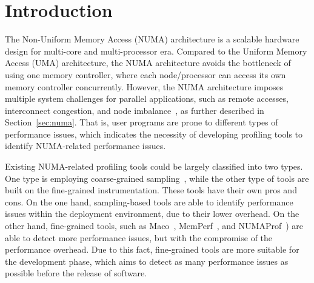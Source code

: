 \section{Introduction}
\label{sec:intro}

The Non-Uniform Memory Access (NUMA) architecture is a scalable hardware design for multi-core and multi-processor era. Compared to the Uniform Memory Access (UMA) architecture, the NUMA architecture avoids the bottleneck of using one memory controller, where each node/processor can access its own memory controller concurrently. However, the NUMA architecture imposes multiple system challenges for parallel applications, such as remote accesses, interconnect congestion, and node imbalance~\cite{Blagodurov:2011:CNC:2002181.2002182}, as further described in Section~\ref{sec:numa}. That is, user programs are prone to different types of performance issues, which indicates the necessity of developing profiling tools to identify NUMA-related performance issues. 

Existing NUMA-related profiling tools could be largely classified into two types. One type is employing coarse-grained sampling~\cite{}, while the other type of tools are built on the fine-grained instrumentation. These tools have their own pros and cons. On the one hand, sampling-based tools are able to identify performance issues within the deployment environment, due to their lower overhead. On the other hand, fine-grained tools, such as Maco~\cite{}, MemPerf~\cite{}, and NUMAProf~\cite{}) are able to detect more performance issues, but with the compromise of the performance overhead. Due to this fact, fine-grained tools are more suitable for the development phase, which aims to detect as many performance issues as possible before the release of software. 


